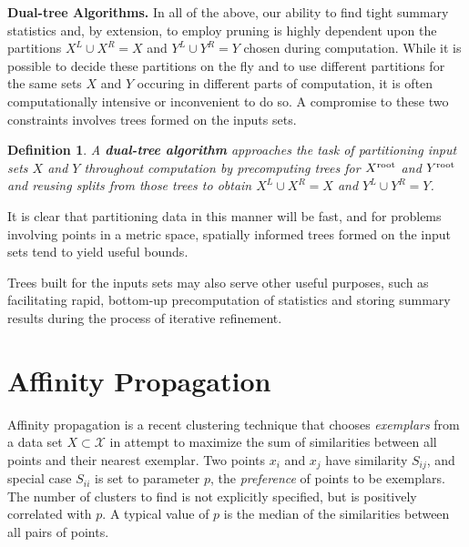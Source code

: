 \documentclass{article}
\newtheorem{definition} {Definition}
\newcommand{\kdroot}[1]{#1^{\text{\rm root}}}
\newcommand{\kdleft}[1]{#1^{\!L}}
\newcommand{\kdright}[1]{#1^{\!R}}
\newcommand{\simil}[2]{S_{#1#2}}
\begin{document}

{\bf Dual-tree Algorithms.}  In all of the above, our ability to find
tight summary statistics and, by extension, to employ pruning is
highly dependent upon the partitions $\kdleft{X} \cup \kdright{X} = X$
and $\kdleft{Y} \cup \kdright{Y} = Y$ chosen during computation.
While it is possible to decide these partitions on the fly and to use
different partitions for the same sets $X$ and $Y$ occuring in
different parts of computation, it is often computationally intensive
or inconvenient to do so.  A compromise to these two constraints
involves trees formed on the inputs sets.
\begin{definition}
  A {\bf dual-tree algorithm} approaches the task of partitioning
  input sets $X$ and $Y$ throughout computation by precomputing trees
  for $\kdroot{X}$ and $\kdroot{Y}$ and reusing splits from those
  trees to obtain $\kdleft{X} \cup \kdright{X} = X$ and $\kdleft{Y}
  \cup \kdright{Y} = Y$.
\end{definition}
\noindent It is clear that partitioning data in this manner will be
fast, and for problems involving points in a metric space, spatially
informed trees formed on the input sets tend to yield useful bounds.

Trees built for the inputs sets may also serve other useful purposes,
such as facilitating rapid, bottom-up precomputation of statistics and
storing summary results during the process of iterative refinement.


\section{Affinity Propagation}


Affinity propagation \cite{affinity} is a recent clustering technique
that chooses {\em exemplars} from a data set $X \subset \mathcal{X}$
in attempt to maximize the sum of similarities between all points and
their nearest exemplar.  Two points $x_i$ and $x_j$ have similarity
$\simil{i}{j}$, and special case $\simil{i}{i}$ is set to parameter
$p$, the {\em preference} of points to be exemplars.  The number of
clusters to find is not explicitly specified, but is positively
correlated with $p$.  A typical value of $p$ is the median of the
similarities between all pairs of points.
\end{document}
